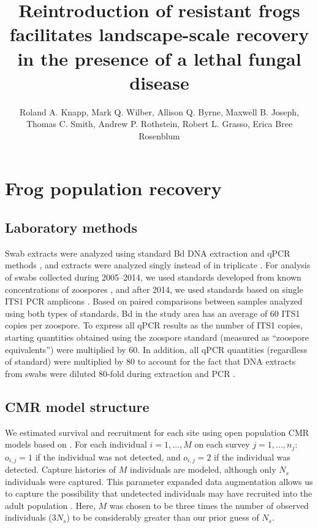 \documentclass[9pt,twoside,lineno]{pnas-new}
\title{Reintroduction of resistant frogs facilitates landscape-scale recovery in the presence of a lethal fungal disease}
\author{Roland A. Knapp, Mark Q. Wilber, Allison Q. Byrne, Maxwell B. Joseph, Thomas C. Smith, Andrew P. Rothstein, Robert L. Grasso, Erica Bree Rosenblum}
\begin{document}
\maketitle

\SItext
\hypertarget{frog-population-recovery-2}{%
\section{Frog population
recovery}\label{frog-population-recovery-2}}

\hypertarget{laboratory-methods}{%
\subsection{Laboratory methods}\label{laboratory-methods}}

Swab extracts were analyzed using standard Bd DNA extraction and qPCR
methods \citep{boyle2004}, and extracts were analyzed singly instead of
in triplicate \citep{kriger2006}. For analysis of swabs collected during
2005--2014, we used standards developed from known concentrations of
zoospores \citep{boyle2004}, and after 2014, we used standards based on
single ITS1 PCR amplicons \citep{longo2013}. Based on paired comparisons
between samples analyzed using both types of standards, Bd in the study
area has an average of 60 ITS1 copies per zoospore. To express all qPCR
results as the number of ITS1 copies, starting quantities obtained using
the zoospore standard (measured as ``zoospore equivalents'') were
multiplied by 60. In addition, all qPCR quantities (regardless of
standard) were multiplied by 80 to account for the fact that DNA
extracts from swabs were diluted 80-fold during extraction and PCR
\citep{vredenburg2010}.

\hypertarget{cmr-model-structure}{%
\subsection{CMR model structure}\label{cmr-model-structure}}

We estimated survival and recruitment for each site using open
population CMR models based on \citep{joseph2018}. For each individual
\(i=1, ..., M\) on each survey \(j=1, ..., n_j\): \(o_{i, j} = 1\) if
the individual was not detected, and \(o_{i, j}=2\) if the individual
was detected. Capture histories of \(M\) individuals are modeled,
although only \(N_s\) individuals were captured. This parameter expanded
data augmentation allows us to capture the possibility that undetected
individuals may have recruited into the adult population
\citep{royle2012}. Here, \(M\) was chosen to be three times the number
of observed individuals (\(3N_s\)) to be considerably greater than our
prior guess of \(N_s\).
\end{document}
